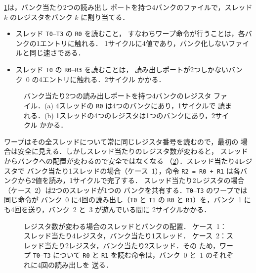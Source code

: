 \documentclass[../main.tex]{subfiles}
\begin{document}
\cref{fig:l04-register-bank-conflict}は，バンク当たり2つの読み出し
ポートを持つ4バンクのファイルで，スレッド $k$ のレジスタをバンク $k$
に割り当てる．
\begin{itemize}
  \item スレッド \texttt{T0}--\texttt{T3} の \texttt{R0} を読むこと，
    すなわちワープ命令が行うことは，各バンクの1エントリに触れる．
    1サイクルに4値であり，バンク化しないファイルと同じ速さである．
  \item スレッド \texttt{T0} の \texttt{R0}--\texttt{R3} を読むことは，
    読み出しポートが2つしかないバンク~0 の4エントリに触れる．2サイクル
    かかる．
\end{itemize}

\begin{figure}[htbp]
  \centering
  
  \caption{バンク当たり2つの読み出しポートを持つ4バンクのレジスタ
    ファイル．(a) 4スレッドの \texttt{R0} は4つのバンクにあり，1サイクルで
    読まれる．(b) 1スレッドの4つのレジスタは1つのバンクにあり，2サイクル
    かかる．}
  \label{fig:l04-register-bank-conflict}
\end{figure}

ワープはその全スレッドについて常に同じレジスタ番号を読むので，最初の
場合は安全に見える．しかしスレッド当たりのレジスタ数が変わると，
スレッドからバンクへの配置が変わるので安全ではなくなる
（\cref{fig:l04-register-layout}）．スレッド当たり4レジスタで
バンク当たり1スレッドの場合（ケース~1），命令
\texttt{R2 = R0 + R1} は各バンクから2値を読み，1サイクルで完了する．
スレッド当たり2レジスタの場合（ケース~2）は2つのスレッドが1つの
バンクを共有する．\texttt{T0}--\texttt{T3} のワープでは同じ命令が
バンク~0 に4回の読み出し（\texttt{T0} と \texttt{T1} の \texttt{R0} と
\texttt{R1}）を，バンク~1 にも4回を送り，バンク~2 と~3 が遊んでいる間に
2サイクルかかる．

\begin{figure}[htbp]
  \centering
  
  \caption{レジスタ数が変わる場合のスレッドとバンクの配置．
    ケース~1：スレッド当たり4レジスタ，バンク当たり1スレッド．
    ケース~2：スレッド当たり2レジスタ，バンク当たり2スレッド．その
    ため，ワープ \texttt{T0}--\texttt{T3} について \texttt{R0} と
    \texttt{R1} を読む命令は，バンク~0 と~1 のそれぞれに4回の読み出しを
    送る．}
  \label{fig:l04-register-layout}
\end{figure}
\end{document}

